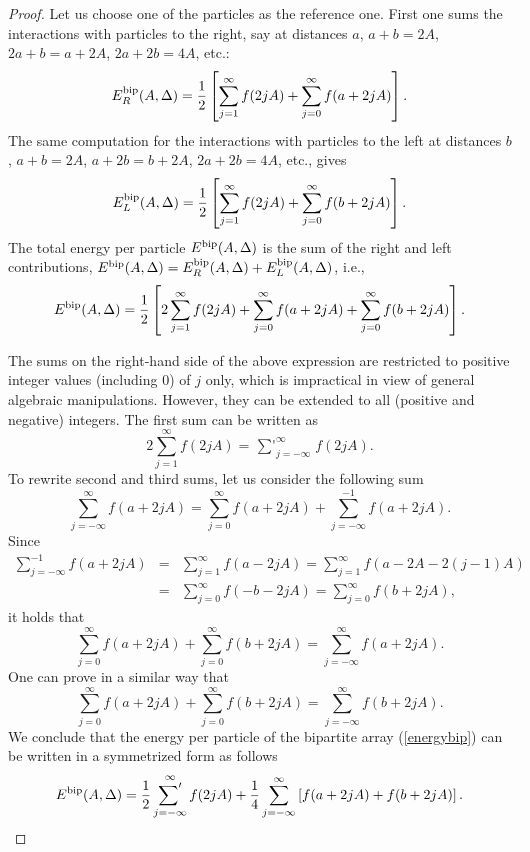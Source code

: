 \documentclass[12pt]{iopart}
\def\xsum{\mathop{\sum\nolimits'}}
\theoremstyle{definition}
\begin{document}
\begin{proof}
Let us choose one of the particles as the reference one.
First one sums the interactions with particles to the right,
say at distances $a$, $a+b=2A$, $2a+b=a+2A$, $2a+2b=4A$, etc.: 
\begin{equation}
E^{\rm bip}_R(A,\Delta) = \frac{1}{2} \left[
\sum_{j=1}^{\infty} f(2jA) + \sum_{j=0}^{\infty} f(a+2jA) \right] .  
\end{equation}
The same computation for the interactions with particles to the left at distances $b$, $a+b=2A$, $a+2b=b+2A$, $2a+2b=4A$, etc., gives 
\begin{equation}
E^{\rm bip}_L(A,\Delta) = \frac{1}{2} \left[
\sum_{j=1}^{\infty} f(2jA) + \sum_{j=0}^{\infty} f(b+2jA) \right] .  
\end{equation}
The total energy per particle $E^{\rm bip}(A,\Delta)$ is the sum
of the right and left contributions,
$E^{\rm bip}(A,\Delta) = E^{\rm bip}_R(A,\Delta) + E^{\rm bip}_L(A,\Delta)$, i.e.,
\begin{equation} \label{energybip}
E^{\rm bip}(A,\Delta) = \frac{1}{2} \left[
2 \sum_{j=1}^{\infty} f(2jA) + \sum_{j=0}^{\infty} f(a+2jA) + 
\sum_{j=0}^{\infty} f(b+2jA) \right] .  
\end{equation}

The sums on the right-hand side of the above expression are restricted
to positive integer values (including 0) of $j$ only, which is impractical
in view of general algebraic manipulations.
However, they can be extended to all (positive and negative) integers. 
The first sum can be written as
\begin{equation}
2 \sum_{j=1}^{\infty} f(2jA) = \xsum_{j=-\infty}^{\infty} f(2jA) . 
\end{equation}
To rewrite second and third sums, let us consider the following sum
\begin{equation}
\sum_{j=-\infty}^{\infty} f(a+2jA) = \sum_{j=0}^{\infty} f(a+2jA) +
\sum_{j=-\infty}^{-1} f(a+2jA) .  
\end{equation}
Since
\begin{eqnarray}
\sum_{j=-\infty}^{-1} f(a+2jA) & = & \sum_{j=1}^{\infty} f(a-2jA)
= \sum_{j=1}^{\infty} f(a-2A-2(j-1)A) \nonumber \\
& = & \sum_{j=0}^{\infty} f(-b-2jA) = \sum_{j=0}^{\infty} f(b+2jA) ,
\end{eqnarray}
it holds that
\begin{equation}
\sum_{j=0}^{\infty} f(a+2jA) + \sum_{j=0}^{\infty} f(b+2jA) 
= \sum_{j=-\infty}^{\infty} f(a+2jA) .
\end{equation}
One can prove in a similar way that
\begin{equation}
\sum_{j=0}^{\infty} f(a+2jA) + \sum_{j=0}^{\infty} f(b+2jA) 
= \sum_{j=-\infty}^{\infty} f(b+2jA) .
\end{equation}
We conclude that the energy per particle of the bipartite array
(\ref{energybip}) can be written in a symmetrized form as follows
\begin{equation} \label{biprepr1}
E^{\rm bip}(A,\Delta) = \frac{1}{2} \xsum_{j=-\infty}^{\infty} f(2jA)
+ \frac{1}{4} \sum_{j=-\infty}^{\infty} \left[ f(a+2jA) + f(b+2jA) \right] .  
\end{equation}


\end{proof}
\end{document}
